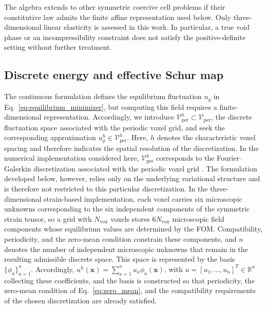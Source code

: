 \documentclass[pdflatex,sn-basic,Numbered]{sn-jnl}
\newcommand{\R}{\mathbb{R}}
\begin{document}
The algebra extends to other symmetric coercive cell problems if their
constitutive law admits the finite affine representation used below.
Only three-dimensional linear elasticity is assessed in this work.
In particular, a true void phase or an incompressibility constraint does not
satisfy the positive-definite setting without further treatment.

\subsection{Discrete energy and effective Schur map}
\label{subsec:schur_map}

The continuous formulation defines the equilibrium fluctuation \(u_g\) in
Eq.~\eqref{eq:equilibrium_minimizer}, but computing this field requires a
finite-dimensional representation. Accordingly, we introduce
\(\mathcal V_{\mathrm{per}}^h\subset\mathcal V_{\mathrm{per}}\), the
discrete fluctuation space associated with the periodic voxel grid, and seek
the corresponding approximation
\(u_g^h\in\mathcal V_{\mathrm{per}}^h\). Here, \(h\) denotes the
characteristic voxel spacing and therefore indicates the spatial resolution
of the discretization. In the numerical implementation considered here,
\(\mathcal V_{\mathrm{per}}^h\) corresponds to the Fourier--Galerkin
discretization associated with the periodic voxel grid
\cite{moulinec1998numerical,vondrejc2014fft}. The formulation developed below,
however, relies only on the underlying variational structure and is therefore
not restricted to this particular discretization. In the three-dimensional
strain-based implementation, each voxel carries six microscopic unknowns
corresponding to the six independent components of the symmetric strain
tensor, so a grid with \(N_{\mathrm{vox}}\) voxels stores
\(6N_{\mathrm{vox}}\) microscopic field components whose equilibrium values
are determined by the FOM. Compatibility, periodicity, and the zero-mean
condition constrain these components, and \(n\) denotes the number of
independent microscopic unknowns that remain in the resulting admissible
discrete space. This space is represented by the basis
\(\{\phi_a\}_{a=1}^{n}\). Accordingly,
\(u^h(\boldsymbol x)=\sum_{a=1}^{n}u_a\phi_a(\boldsymbol x)\), with
\(u=[u_1,\ldots,u_n]^T\in\R^n\) collecting these coefficients, and the basis
is constructed so that periodicity, the zero-mean condition of
Eq.~\eqref{eq:zero_mean}, and the compatibility requirements of the chosen
discretization are already satisfied.
\end{document}

